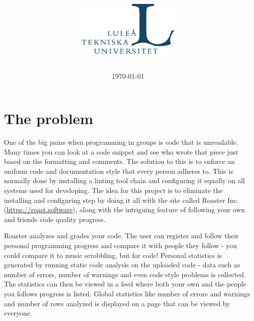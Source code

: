 \documentclass[12pt,a4paper]{report}
\title{
    \coursecode{} \\
    \coursename{} \\
    \vspace{1.8em}
    \begin{figure}[H]
      \centering
      
    \end{figure}
    \textbf{\projectname{}} \break
    \author{
        \authorsinfo{}
    } \break{}
    \schoolinfo{}
    \vspace{1.8em}
    \begin{figure}[H]
      \centering
      \includegraphics[width=5cm]{LTU.jpg}
    \end{figure}
}
\date{\today}
\begin{document}
\maketitle
\thispagestyle{empty} %
\newpage

{\hypersetup{linkcolor=black}
    \tableofcontents}
\newpage

\newpage

\chapter{The problem}
One of the big pains when programming in groups is code that is unreadable. Many times you can look at a code snippet and see who wrote that piece
just based on the formatting and comments. The solution to this is to enforce an uniform code and documentation style that every person adheres to.
This is normally done by installing a linting tool chain and configuring it equally on all systems used for developing.
The idea for this project is to eliminate the installing and configuring step by doing it all with the site called Roaster Inc. (\url{https://roast.software}), along with the intriguing feature of following your own and friends code quality progress.

Roaster analyzes and grades your code. The user can register and follow their personal programming progress and compare it with people they follow - you could compare it to music scrobbling, but for code! Personal statistics is generated by running static code analysis on the uploaded code - data such as number of errors, number of warnings and even code style problems is collected. The statistics can then be viewed in a feed where both your own and the people you follows progress is listed. Global statistics like number of errors and warnings and number of rows analyzed is displayed on a page that can be viewed by everyone.

%
\end{document}
